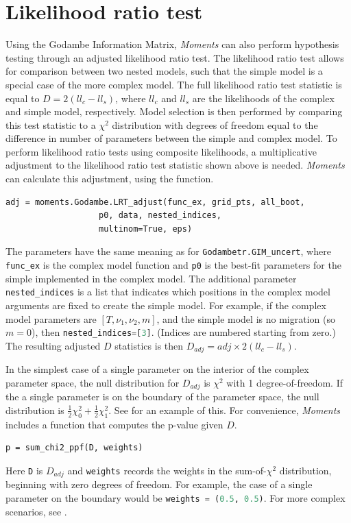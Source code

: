 \documentclass[12pt]{article}
\makeatletter
\newcommand{\py}[1]{\lstinline[breaklines=true,language=Python, showstringspaces=False]@#1@}
\makeatother
\begin{document}
\section{Likelihood ratio test}
Using the Godambe Information Matrix, \textit{Moments} can also perform hypothesis testing through an adjusted likelihood ratio test.
The likelihood ratio test allows for comparison between two nested models, such that the simple model is a special case of the more complex model.
The full likelihood ratio test statistic is equal to $D = 2(ll_{c}-ll_{s})$, where $ll_{c}$ and $ll_{s}$ are the likelihoods of the complex and simple model, respectively.
Model selection is then performed by comparing this test statistic to a $\chi^2$ distribution with degrees of freedom equal to the difference in number of parameters between the simple and complex model.
To perform likelihood ratio tests using composite likelihoods, a multiplicative adjustment to the likelihood ratio test statistic shown above is needed.
\textit{Moments} can calculate this adjustment, using the function.
\begin{lstlisting}
adj = moments.Godambe.LRT_adjust(func_ex, grid_pts, all_boot,
			 	   p0, data, nested_indices, 
				   multinom=True, eps)
\end{lstlisting}
The parameters have the same meaning as for \py{Godambetr.GIM_uncert}, where \py{func_ex} is the complex model function and \py{p0} is the best-fit parameters for the simple implemented in the complex model.
The additional parameter \py{nested_indices} is a list that indicates which positions in the complex model arguments are fixed to create the simple model.
For example, if the complex model parameters are $[T, \nu_1, \nu_2, m]$, and the simple model is no migration (so $m = 0$), then \py{nested_indices=[3]}.
(Indices are numbered starting from zero.)
The resulting adjusted $D$ statistics is then $D_{adj} = adj \times 2(ll_{c}-ll_{s})$.

In the simplest case of a single parameter on the interior of the complex parameter space, the null distribution for $D_{adj}$ is $\chi^2$ with 1 degree-of-freedom.
If the a single parameter is on the boundary of the parameter space, the null distribution is $\frac{1}{2}\chi^2_0 + \frac{1}{2}\chi^2_1$.
See \cite{Coffman2015} for an example of this.
For convenience, \textit{Moments} includes a function that computes the p-value given $D$.
\begin{lstlisting}
p = sum_chi2_ppf(D, weights)
\end{lstlisting}
Here \py{D} is $D_{adj}$ and \py{weights} records the weights in the sum-of-$\chi^2$ distribution, beginning with zero degrees of freedom.
For example, the case of a single parameter on the boundary would be \py{weights = (0.5, 0.5)}.
For more complex scenarios, see \cite{Self1987}.
\end{document}
